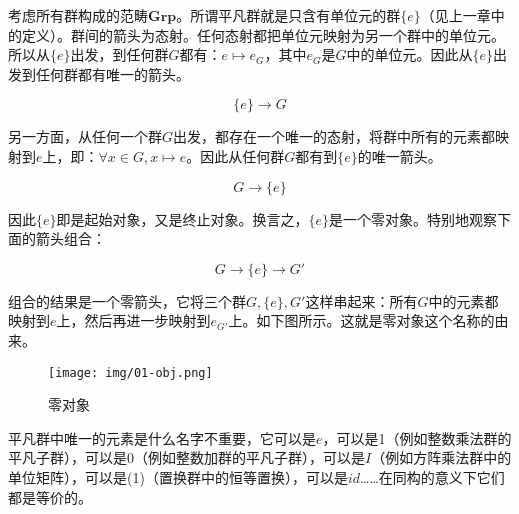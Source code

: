 \documentclass{article}
\begin{document}
\begin{example}
考虑所有群构成的范畴$\pmb{Grp}$。所谓平凡群就是只含有单位元的群$\{e\}$（见上一章中的定义）。群间的箭头为态射。任何态射都把单位元映射为另一个群中的单位元。所以从$\{e\}$出发，到任何群$G$都有：$e \mapsto e_G$，其中$e_G$是$G$中的单位元。因此从$\{e\}$出发到任何群都有唯一的箭头。

\[
\{e\} \longrightarrow G
\]

另一方面，从任何一个群$G$出发，都存在一个唯一的态射，将群中所有的元素都映射到$e$上，即：$\forall x \in G, x \mapsto e$。因此从任何群$G$都有到$\{e\}$的唯一箭头。

\[
G \longrightarrow \{e\}
\]

因此$\{e\}$即是起始对象，又是终止对象。换言之，$\{e\}$是一个零对象。特别地观察下面的箭头组合：

\[
  G \longrightarrow \{e\} \longrightarrow G'
\]

组合的结果是一个零箭头，它将三个群$G, \{e\}, G'$这样串起来：所有$G$中的元素都映射到$e$上，然后再进一步映射到$e_{G'}$上。如下图所示。这就是零对象这个名称的由来。

\begin{figure}[htbp]
 \centering
 \texttt{[image: img/01-obj.png]}
 \caption{零对象}
 \label{fig:zero-obj}
\end{figure}

平凡群中唯一的元素是什么名字不重要，它可以是$e$，可以是1（例如整数乘法群的平凡子群），可以是0（例如整数加群的平凡子群），可以是$I$（例如方阵乘法群中的单位矩阵），可以是(1)（置换群中的恒等置换），可以是$id$……在同构的意义下它们都是等价的。
\end{example}
\end{document}
